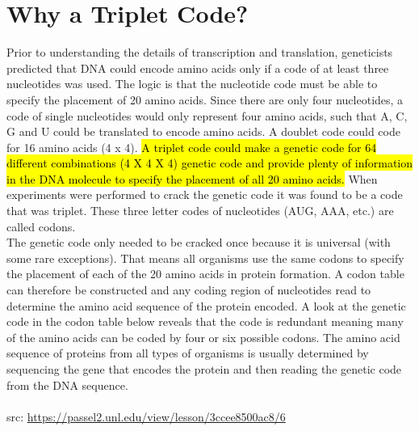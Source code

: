 \section*{Why a Triplet Code?}
Prior to understanding the details of transcription and translation, geneticists predicted that DNA could encode amino acids only if a code of at least three nucleotides was used. The logic is that the nucleotide code must be able to specify the placement of 20 amino acids. Since there are only four nucleotides, a code of single nucleotides would only represent four amino acids, such that A, C, G and U could be translated to encode amino acids. A doublet code could code for 16 amino acids (4 x 4). \hl{A triplet code could make a genetic code for 64 different combinations (4 X 4 X 4) genetic code and provide plenty of information in the DNA molecule to specify the placement of all 20 amino acids.} When experiments were performed to crack the genetic code it was found to be a code that was triplet. These three letter codes of nucleotides (AUG, AAA, etc.) are called codons.\\
The genetic code only needed to be cracked once because it is universal (with some rare exceptions). That means all organisms use the same codons to specify the placement of each of the 20 amino acids in protein formation. A codon table can therefore be constructed and any coding region of nucleotides read to determine the amino acid sequence of the protein encoded. A look at the genetic code in the codon table below reveals that the code is redundant meaning many of the amino acids can be coded by four or six possible codons. The amino acid sequence of proteins from all types of organisms is usually determined by sequencing the gene that encodes the protein and then reading the genetic code from the DNA sequence.
\\\\src: \url{https://passel2.unl.edu/view/lesson/3ccee8500ac8/6}